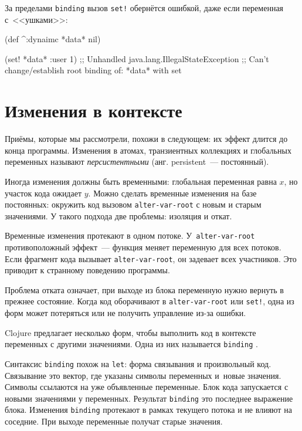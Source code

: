 \noindent
За пределами \verb|binding| вызов \verb|set!| обернётся ошибкой, даже если
переменная с~<<ушками>>:

\begin{english}
  \begin{clojure}
(def ^:dynaimc *data* nil)

(set! *data* {:user 1})
;; Unhandled java.lang.IllegalStateException
;; Can't change/establish root binding of: *data* with set
  \end{clojure}
\end{english}

\section{Изменения в контексте}


Приёмы, которые мы рассмотрели, похожи в следующем: их эффект длится до конца
программы. Изменения в атомах, транзиентных коллекциях и глобальных переменных
называют \emph{персистентными} (анг. persistent~--- постоянный).

Иногда изменения должны быть временными: глобальная переменная равна $x$, но
участок кода ожидает $y$. Можно сделать временные изменения на базе постоянных:
окружить код вызовом \verb|alter-var-root| с новым и старым значениями. У
такого подхода две проблемы: изоляция и откат.


Временные изменения протекают в одном потоке. У~\verb|alter-var-root|
противоположный эффект~--- функция меняет переменную для всех потоков. Если
фрагмент кода вызывает \verb|alter-var-root|, он задевает всех участников. Это
приводит к странному поведению программы.

Проблема отката означает, при выходе из блока переменную нужно вернуть в прежнее
состояние. Когда код оборачивают в \verb|alter-var-root| или \verb|set!|, одна
из форм может потеряться или не получить управление из-за ошибки.

Clojure предлагает несколько форм, чтобы выполнить код в контексте переменных с
другими значениями. Одна из них называется \verb|binding| .


Синтаксис \verb|binding| похож на \verb|let|: форма связывания и
произвольный код. Связывание это вектор, где указаны символы переменных и~новые
значения. Символы ссылаются на уже объявленные переменные. Блок кода запускается
с новыми значениями у переменных. Результат \verb|binding| это последнее
выражение блока. Изменения \verb|binding| протекают в рамках текущего потока и
не влияют на соседние. При выходе переменные получат старые значения.

